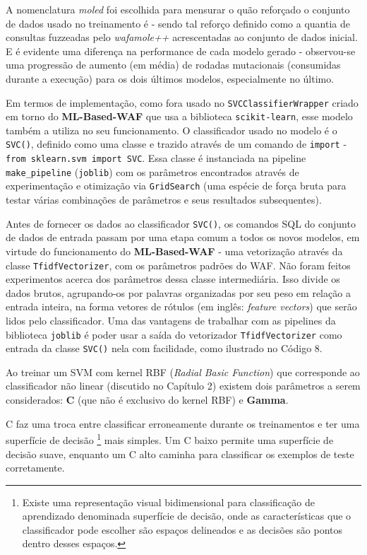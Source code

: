 A nomenclatura \textit{moled} foi escolhida para mensurar o quão reforçado o conjunto de dados usado no treinamento é - sendo tal reforço definido como a quantia de consultas fuzzeadas pelo \textit{wafamole++} acrescentadas ao conjunto de dados inicial. E é evidente uma diferença na performance de cada modelo gerado - observou-se uma progressão de aumento (em média) de rodadas mutacionais (consumidas durante a execução) para os dois últimos modelos, especialmente no último.

Em termos de implementação, como fora usado no \verb+SVCClassifierWrapper+ criado em torno do \textbf{ML-Based-WAF} que usa a biblioteca \verb+scikit-learn+, esse modelo também a utiliza no seu funcionamento. O classificador usado no modelo é o \verb+SVC()+, definido como uma classe e trazido através de um comando de \verb+import+ - \verb+from sklearn.svm import SVC+. Essa classe é instanciada na pipeline \verb+make_pipeline+ (\verb+joblib+) com os parâmetros encontrados através de experimentação e otimização via \verb+GridSearch+ (uma espécie de força bruta para testar várias combinações de parâmetros e seus resultados subsequentes).

Antes de fornecer os dados ao classificador \verb+SVC()+, os comandos SQL do conjunto de dados de entrada passam por uma etapa comum a todos os novos modelos, em virtude do funcionamento do \textbf{ML-Based-WAF} - uma vetorização através da classe \verb+TfidfVectorizer+, com os parâmetros padrões do WAF. Não foram feitos experimentos acerca dos parâmetros dessa classe intermediária. Isso divide os dados brutos, agrupando-os por palavras organizadas por seu peso em relação a entrada inteira, na forma vetores de rótulos (em inglês: \textit{feature vectors}) que serão lidos pelo classificador. Uma das vantagens de trabalhar com as pipelines da biblioteca \verb+joblib+ é poder usar a saída do vetorizador \verb+TfidfVectorizer+ como entrada da classe \verb+SVC()+ nela com facilidade, como ilustrado no Código 8.

Ao treinar um SVM com kernel RBF (\textit{Radial Basic Function}) que corresponde ao classificador não linear (discutido no Capítulo 2) existem dois parâmetros a serem considerados: \textbf{C} (que não é exclusivo do kernel RBF) e \textbf{Gamma}.

C faz uma troca entre classificar erroneamente durante os treinamentos e ter uma superfície de decisão \footnote{Existe uma representação visual bidimensional para classificação de aprendizado denominada superfície de decisão, onde as características que o classificador pode escolher são espaços delineados e as decisões são pontos dentro desses espaços.} mais simples. Um C baixo permite uma superfície de decisão suave, enquanto um C alto caminha para classificar os exemplos de teste corretamente. 

